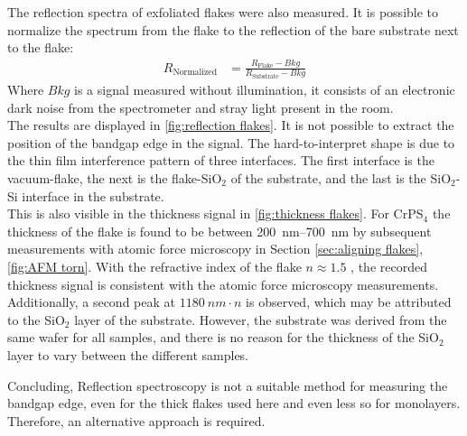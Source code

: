 \documentclass[
	twoside,
	parskip=half,
	a4paper,
]{scrbook}
\begin{document}
The reflection spectra of exfoliated flakes were also measured.
It is possible to normalize the spectrum from the flake to the reflection of the bare substrate next to the flake:
\begin{align}
	R_\text{Normalized} &= \frac{R_\text{Flake} - Bkg}{R_\text{Substrate} - Bkg}
\end{align}
Where $Bkg$ is a signal measured without illumination, it consists of an electronic dark noise from the spectrometer and stray light present in the room.\\
The results are displayed in \autoref{fig:reflection flakes}.
It is not possible to extract the position of the bandgap edge in the signal.
The hard-to-interpret shape is due to the thin film interference pattern of three interfaces.
The first interface is the vacuum-flake, the next is the flake-SiO$_2$ of the substrate, and the last is the SiO$_2$-Si interface in the substrate.\\
This is also visible in the thickness signal in \autoref{fig:thickness flakes}.
For CrPS$_4$ the thickness of the flake is found to be between \SIrange{200}{700}{nm} by subsequent measurements with atomic force microscopy in Section \ref{sec:aligning flakes}, \autoref{fig:AFM torn}.
With the refractive index of the flake $n\approx1.5$ \cite{CrPS4_refrative}, the recorded thickness signal is consistent with the atomic force microscopy measurements.
Additionally, a second peak at $\SI{1180}{nm}\cdot n$ is observed, which may be attributed to the SiO$_2$ layer of the substrate. 
However, the substrate was derived from the same wafer for all samples, and there is no reason for the thickness of the SiO$_2$ layer to vary between the different samples.

Concluding, Reflection spectroscopy is not a suitable method for measuring the bandgap edge, even for the thick flakes used here and even less so for monolayers. 
Therefore, an alternative approach is required.
\end{document}
